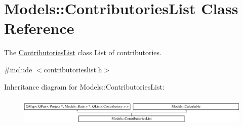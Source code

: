 \hypertarget{classModels_1_1ContributoriesList}{}\section{Models\+:\+:Contributories\+List Class Reference}
\label{classModels_1_1ContributoriesList}


The \hyperlink{classModels_1_1ContributoriesList}{Contributories\+List} class List of contributories.  




{\ttfamily \#include $<$contributorieslist.\+h$>$}

Inheritance diagram for Models\+:\+:Contributories\+List\+:\begin{figure}[H]
\begin{center}
\leavevmode
\includegraphics[height=1.355932cm]{d7/d6a/classModels_1_1ContributoriesList}
\end{center}
\end{figure}
